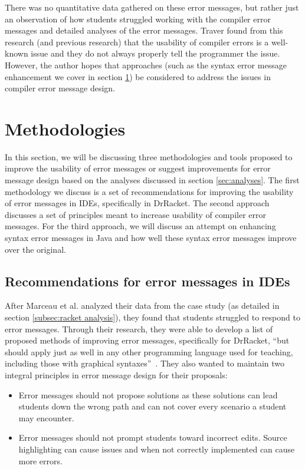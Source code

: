 \documentclass{sig-alternate}
\begin{document}
There was no quantitative data gathered on these error messages, but rather just an observation of how students struggled working with the compiler error messages and detailed analyses of the error messages.
Traver found from this research (and previous research) that the usability of compiler errors is a well-known issue and they do not always properly tell the programmer the issue.
However, the author hopes that approaches (such as the syntax error message enhancement we cover in section \ref{sec:methodologies}) be considered to address the issues in compiler error message design.


\section{Methodologies}\label{sec:methodologies}
In this section, we will be discussing three methodologies and tools proposed to improve the usability of error messages or suggest improvements for error message design based on the analyses discussed in section \ref{sec:analyses}.
The first methodology we discuss is a set of recommendations for improving the usability of error messages in IDEs, specifically in DrRacket.
The second approach discusses a set of principles meant to increase usability of compiler error messages.
For the third approach, we will discuss an attempt on enhancing syntax error messages in Java and how well these syntax error messages improve over the original. 

\subsection{Recommendations for error messages in IDEs}\label{subsec:error message rubric}
After Marceau et al. analyzed their data from the case study (as detailed in section \ref{subsec:racket analysis}), they found that students struggled to respond to error messages.
Through their research, they were able to develop a list of proposed methods of improving error messages, specifically for DrRacket, ``but  should apply just as well in any other programming language used for teaching, including those with
graphical syntaxes''~\cite{Marceau:2011:MYL:2048237.2048241}.
They also wanted to maintain two integral principles in error message design for their proposals:

\begin{itemize}
	\item Error messages should not propose solutions as these solutions can lead students down the wrong path and can not cover every scenario a student may encounter.
	\item Error messages should not prompt students toward incorrect edits. Source highlighting can cause issues and when not correctly implemented can cause more errors.
\end{itemize}
\end{document}

